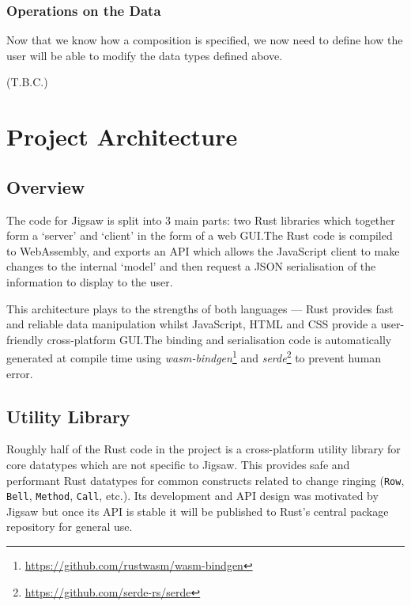 \documentclass[12pt]{article}
\newcommand{\footurl}[1]{\footnote{\url{#1}}}
\begin{document}
\subsubsection{Operations on the Data}

Now that we know how a composition is specified, we now need to define how the user will be able to
modify the data types defined above.

(T.B.C.)



\pagebreak

\section{Project Architecture}\label{sec:proj_arch}

\subsection{Overview}

The code for Jigsaw is split into 3 main parts: two Rust libraries which together form a `server'
and `client' in the form of a web GUI.\@  The Rust code is compiled to WebAssembly, and exports an
API which allows the JavaScript client to make changes to the internal `model' and then request a
JSON serialisation of the information to display to the user.

This architecture plays to the strengths of both languages --- Rust provides fast and reliable data
manipulation whilst JavaScript, HTML and CSS provide a user-friendly cross-platform GUI.\@  The
binding and serialisation code is automatically generated at compile time using
\emph{wasm-bindgen}\footurl{https://github.com/rustwasm/wasm-bindgen} and
\emph{serde}\footurl{https://github.com/serde-rs/serde} to prevent human error.

\subsection{Utility Library}

Roughly half of the Rust code in the project is a cross-platform utility library for core datatypes
which are not specific to Jigsaw.  This provides safe and performant Rust datatypes for common
constructs related to change ringing (\verb|Row|, \verb|Bell|, \verb|Method|, \verb|Call|, etc.).
Its development and API design was motivated by Jigsaw but once its API is stable it will be
published to Rust's central package repository for general use.
\end{document}
